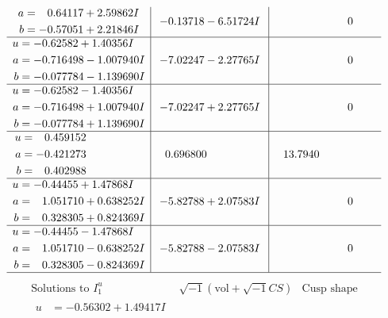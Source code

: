 \documentclass[1p]{elsarticle_modified}
\theoremstyle{definition}
\newcommand{\I}{\sqrt{-1}}
\begin{document}
$$\begin{array}{c|c|c}
\begin{aligned}
a &= \phantom{-}0.64117 + 2.59862 I \\
b &= -0.57051 + 2.21846 I\end{aligned}
 & -0.13718 - 6.51724 I & \phantom{-0.000000 } 0 \\ \hline\begin{aligned}
u &= -0.62582 + 1.40356 I \\
a &= -0.716498 - 1.007940 I \\
b &= -0.077784 - 1.139690 I\end{aligned}
 & -7.02247 - 2.27765 I & \phantom{-0.000000 } 0 \\ \hline\begin{aligned}
u &= -0.62582 - 1.40356 I \\
a &= -0.716498 + 1.007940 I \\
b &= -0.077784 + 1.139690 I\end{aligned}
 & -7.02247 + 2.27765 I & \phantom{-0.000000 } 0 \\ \hline\begin{aligned}
u &= \phantom{-}0.459152\phantom{ +0.000000I} \\
a &= -0.421273\phantom{ +0.000000I} \\
b &= \phantom{-}0.402988\phantom{ +0.000000I}\end{aligned}
 & \phantom{-}0.696800\phantom{ +0.000000I} & \phantom{-}13.7940\phantom{ +0.000000I} \\ \hline\begin{aligned}
u &= -0.44455 + 1.47868 I \\
a &= \phantom{-}1.051710 + 0.638252 I \\
b &= \phantom{-}0.328305 + 0.824369 I\end{aligned}
 & -5.82788 + 2.07583 I & \phantom{-0.000000 } 0 \\ \hline\begin{aligned}
u &= -0.44455 - 1.47868 I \\
a &= \phantom{-}1.051710 - 0.638252 I \\
b &= \phantom{-}0.328305 - 0.824369 I\end{aligned}
 & -5.82788 - 2.07583 I & \phantom{-0.000000 } 0\\
 \hline 
 \end{array}$$\newpage$$\begin{array}{c|c|c}  
\text{Solutions to }I^u_{1}& \I (\text{vol} + \sqrt{-1}CS) & \text{Cusp shape}\\
 \hline 
\begin{aligned}
u &= -0.56302 + 1.49417 I \\

\end{aligned}
\end{array}$$
\end{document}
